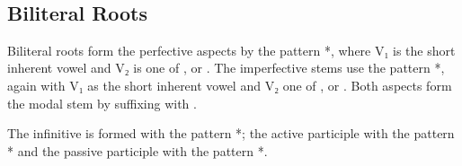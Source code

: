 \documentclass[grammar]{subfiles}
\begin{document}
\begin{table}[h!]\small\capstart
  \centering
  \\
  \caption{Pattern VI triliteral stems \label{tab:vm_vi_triliteral_stems}}
\end{table}


\subsection{Biliteral Roots}
\label{ssec:vm_vi_biliteral_roots}

Biliteral roots form the perfective aspects by the pattern *,
where V₁ is the short inherent vowel and V₂ is one of ,  or
.  The imperfective stems use the pattern *, again with
V₁ as the short inherent vowel and V₂ one of ,  or .  Both
aspects form the modal stem by suffixing with . 

The infinitive is formed with the pattern *; the active
participle with the pattern * and the passive participle with the
pattern *. 
\end{document}
